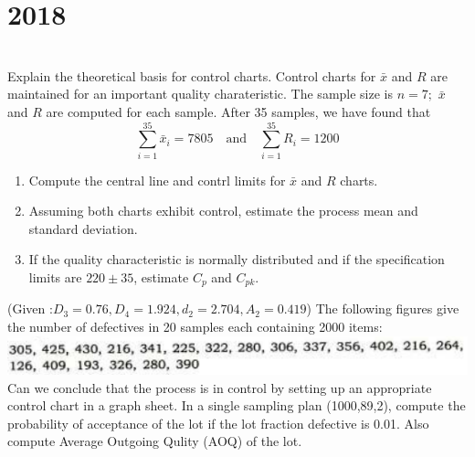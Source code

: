 \section*{2018}
\vspace{-.5cm}
\hrulefill \smallskip\\
 Explain the theoretical basis for control charts.
\myline 
{} Control charts for $\bar{x}$ and $R$ are maintained for an important quality charateristic. The sample size is $n=7;$ $\bar{x}$ and $R$ are computed for each sample. After 35 samples, we have found that \[\sum_{i=1}^{35}\bar{x}_i = 7805 \quad\text{and}\quad \sum_{i=1}^{35}R_i =1200 \]
\begin{enumerate}[topsep=0pt, itemsep = -1ex,label=(\roman*)]
    \item Compute the central line and contrl limits for $\bar{x}$ and $R$ charts.
    \item Assuming both charts exhibit control, estimate the process mean and standard deviation.
    \item If the quality characteristic is normally distributed and if the specification limits are $220\pm35$, estimate $C_p$ and $C_{pk}$.
\end{enumerate} (Given :$D_3=0.76,D_4=1.924,d_2=2.704,A_2=0.419$)
\myline
{} The following figures give the number of defectives in 20 samples each containing 2000 items:\\
\includegraphics[]{IS/QC/4a2018.PNG} Can we conclude that the process is in control by setting up an appropriate control chart in a graph sheet.
\myline
{} In a single sampling plan (1000,89,2), compute the probability of acceptance of the lot if the lot fraction defective is 0.01. Also compute Average Outgoing Qulity (AOQ) of the lot.
